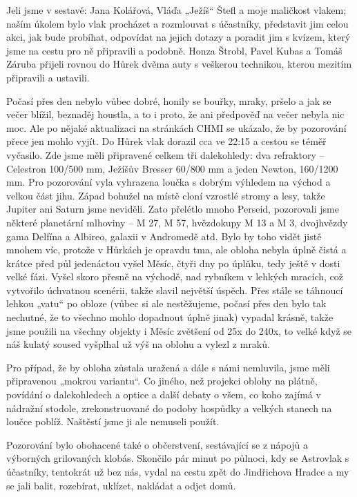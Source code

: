 \documentclass[10pt,a5paper,twoside]{book}
\begin{document}
Jeli jsme v sestavě: Jana Kolářová, Vláďa „Ježíš“ Štefl a moje maličkost vlakem; naším úkolem bylo vlak procházet a rozmlouvat s účastníky, představit jim celou akci, jak bude probíhat, odpovídat na jejich dotazy a poradit jim s kvízem, který jsme na cestu pro ně připravili a podobně. Honza Štrobl, Pavel Kubas a Tomáš Záruba přijeli rovnou do Hůrek dvěma auty s veškerou technikou, kterou mezitím připravili a ustavili.

Počasí přes den nebylo vůbec dobré, honily se bouřky, mraky, pršelo a jak se večer blížil, beznaděj houstla, a to i proto, že ani předpověď na večer nebyla nic moc. Ale po nějaké aktualizaci na stránkách CHMI se ukázalo, že by pozorování přece jen mohlo vyjít. Do Hůrek vlak dorazil cca ve 22:15 a cestou se téměř vyčasilo. Zde jsme měli připravené celkem tři dalekohledy: dva refraktory – Celestron 100/500 mm, Ježíšův Bresser 60/800 mm a jeden Newton, 160/1200 mm. Pro pozorování vyla vyhrazena loučka s dobrým výhledem na východ a velkou část jihu. Západ bohužel na místě cloní vzrostlé stromy a lesy, takže Jupiter ani Saturn jsme neviděli. Zato přelétlo mnoho Perseid, pozorovali jsme některé planetární mlhoviny – M 27, M 57, hvězdokupy M 13 a M 3, dvojhvězdy gama Delfína a Albireo, galaxii v Andromedě atd. Bylo by toho vidět jistě mnohem víc, protože v Hůrkách je opravdu tma, ale obloha nebyla úplně čistá a krátce před půl jedenáctou vyšel Měsíc, čtyři dny po úplňku, tedy ještě v dosti velké fázi. Vyšel skoro přesně na východě, nad rybníkem v lehkých mracích, což vytvořilo úchvatnou scenérii, takže slavil největší úspěch. Přes stále se táhnoucí lehkou „vatu“ po obloze (vůbec si ale nestěžujeme, počasí přes den bylo tak nechutné, že to všechno mohlo dopadnout úplně jinak) vypadal krásně, takže jsme použili na všechny objekty i Měsíc zvětšení od 25x do 240x, to velké když se náš kulatý soused vyšplhal už výš na oblohu a vylezl z mraků.


Pro případ, že by obloha zůstala uražená a dále s námi nemluvila, jsme měli připravenou „mokrou variantu“. Co jiného, než projekci oblohy na plátně, povídání o dalekohledech a optice a další debaty o všem, co koho zajímá v nádražní stodole, zrekonstruované do podoby hospůdky a velkých stanech na loučce poblíž. Naštěstí jsme ji ale nemuseli použít.


Pozorování bylo obohacené také o občerstvení, sestávající se z nápojů a výborných grilovaných klobás. Skončilo pár minut po půlnoci, kdy se Astrovlak s účastníky, tentokrát už bez nás, vydal na cestu zpět do Jindřichova Hradce a my se jali balit, rozebírat, uklízet, nakládat a odjet domů.
\end{document}
